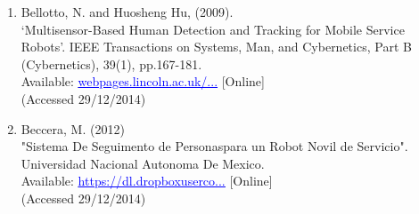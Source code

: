 \documentclass{article}
\begin{document}
\begin{multicols}{2}
\begin{enumerate}
\item Bellotto, N. and Huosheng Hu, (2009).
\\‘Multisensor-Based Human Detection and Tracking for Mobile Service Robots’. IEEE Transactions on Systems, Man, and Cybernetics, Part B (Cybernetics), 39(1), pp.167-181. \\ Available: \href{webpages.lincoln.ac.uk/nbellotto/doc/Bellotto2009.pdf}{\textcolor{blue}{\uline{webpages.lincoln.ac.uk/...}}} [Online]
\\(Accessed 29/12/2014)

\item Beccera, M. (2012)
\\"Sistema De Seguimento de Personaspara un Robot Novil de Servicio". Universidad Nacional Autonoma De Mexico.
\\Available: \href{https://dl.dropboxusercontent.com/u/53733773/web/files/Becerra12_MEngThesis.pdf}{\textcolor{blue}{\uline{https://dl.dropboxuserco...}}} [Online]
\\(Accessed 29/12/2014)

\end{enumerate}
\end{multicols}
\end{document}
